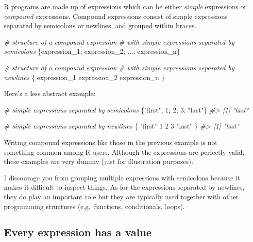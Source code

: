 \documentclass[
]{book}
\newenvironment{Shaded}{\begin{snugshade}}{\end{snugshade}}
\newcommand{\CommentTok}[1]{\textcolor[rgb]{0.56,0.35,0.01}{\textit{#1}}}
\newcommand{\DecValTok}[1]{\textcolor[rgb]{0.00,0.00,0.81}{#1}}
\newcommand{\NormalTok}[1]{#1}
\newcommand{\StringTok}[1]{\textcolor[rgb]{0.31,0.60,0.02}{#1}}
\begin{document}
R programs are made up of expressions which can be either \emph{simple} expressions
or \emph{compound} expressions. Compound expressions consist of simple expressions
separated by semicolons or newlines, and grouped within braces.

\begin{Shaded}
\begin{Highlighting}[]
\CommentTok{\# structure of a compound expression}
\CommentTok{\# with simple expressions separated by semicolons}
\NormalTok{\{expression\_1; expression\_2; ...; expression\_n\}}

\CommentTok{\# structure of a compound expression}
\CommentTok{\# with simple expressions separated by newlines}
\NormalTok{\{}
\NormalTok{  expression\_1}
\NormalTok{  expression\_2}
\NormalTok{  expression\_n}
\NormalTok{\}}
\end{Highlighting}
\end{Shaded}

Here's a less abstract example:

\begin{Shaded}
\begin{Highlighting}[]
\CommentTok{\# simple expressions separated by semicolons}
\NormalTok{\{}\StringTok{"first"}\NormalTok{; }\DecValTok{1}\NormalTok{; }\DecValTok{2}\NormalTok{; }\DecValTok{3}\NormalTok{; }\StringTok{"last"}\NormalTok{\}}
\CommentTok{\#\textgreater{} [1] "last"}

\CommentTok{\# simple expressions separated by newlines}
\NormalTok{\{}
  \StringTok{"first"}
  \DecValTok{1}
  \DecValTok{2}
  \DecValTok{3}
  \StringTok{"last"}
\NormalTok{\}}
\CommentTok{\#\textgreater{} [1] "last"}
\end{Highlighting}
\end{Shaded}

Writing compound expressions like those in the previous example is not
something common among R users. Although the expressions are perfectly valid,
these examples are very dummy (just for illustration purposes).

I discourage you from grouping multiple expressions with semicolons because
it makes it difficult to inspect things. As for the expressions separated by
newlines, they do play an important role but they are typically used together
with other programming structures (e.g.~functions, conditionals, loops).

\hypertarget{every-expression-has-a-value}{%
\subsection{Every expression has a value}\label{every-expression-has-a-value}}
\end{document}
